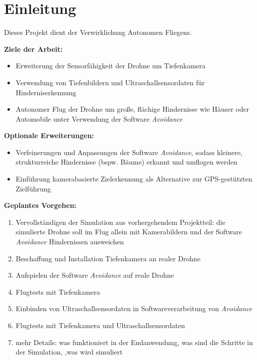 \chapter{Einleitung}
Dieses Projekt dient der Verwirklichung Autonomen Fliegens.

\textbf{Ziele der Arbeit:}
\begin{itemize}
    \item Erweiterung der Sensorfähigkeit der Drohne um Tiefenkamera
    \item Verwendung von Tiefenbildern und Ultraschallsensordaten für Hinderniserkennung 
    \item Autonomer Flug der Drohne um große, flächige Hindernisse wie Häuser oder Automobile unter Verwendung der Software \textit{Avoidance}
\end{itemize}

\textbf{Optionale Erweiterungen:}
\begin{itemize}
    \item Verfeinerungen und Anpassungen der Software \textit{Avoidance}, sodass kleinere, strukturreiche Hindernisse (bspw. Bäume) erkannt und umflogen werden
    \item Einführung kamerabasierte Zielerkennung als Alternative zur GPS-gestützten Zielführung
\end{itemize}

\textbf{Geplantes Vorgehen:}
\begin{enumerate}
    \item Vervollständigen der Simulation aus vorhergehendem Projektteil: die simulierte Drohne soll im Flug allein mit Kamerabildern und der Software \textit{Avoidance} Hindernissen ausweichen 
    \item Beschaffung und Installation Tiefenkamera an realer Drohne
    \item Aufspielen der Software \textit{Avoidance} auf reale Drohne
    \item Flugtests mit Tiefenkamera
    \item Einbinden von Ultraschallsensordaten in Softwareverarbeitung von \textit{Avoidance}
    \item Flugtests mit Tiefenkamera und Ultraschallsensordaten
    \item mehr Details: was funktioniert in der Endanwendung, was sind die Schritte in der Simulation, ,was wird simuliert
\end{enumerate}

